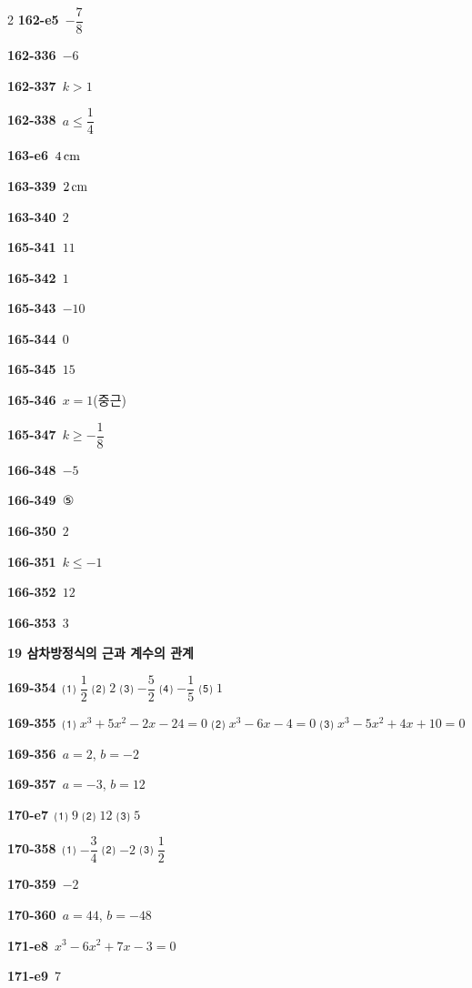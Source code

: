 \documentclass[10pt,a4paper]{article}
\begin{document}
\begin{multicols}{2}
\noindent\textbf{162-e5}\ $-\dfrac{7}{8}$\par
\noindent\textbf{162-336}\ $-6$\par
\noindent\textbf{162-337}\ $k>1$\par
\noindent\textbf{162-338}\ $a\le\dfrac{1}{4}$\par
\noindent\textbf{163-e6}\ $4\mkern3mu \mathrm{cm}$\par
\noindent\textbf{163-339}\ $2\mkern3mu \mathrm{cm}$\par
\noindent\textbf{163-340}\ $2$\par
\noindent\textbf{165-341}\ $11$\par
\noindent\textbf{165-342}\ $1$\par
\noindent\textbf{165-343}\ $-10$\par
\noindent\textbf{165-344}\ $0$\par
\noindent\textbf{165-345}\ $15$\par
\noindent\textbf{165-346}\ $x=1$(중근)\par
\noindent\textbf{165-347}\ $k\ge-\dfrac{1}{8}$\par
\noindent\textbf{166-348}\ $-5$\par
\noindent\textbf{166-349}\ ⑤\par
\noindent\textbf{166-350}\ $2$\par
\noindent\textbf{166-351}\ $k\le -1$\par
\noindent\textbf{166-352}\ $12$\par
\noindent\textbf{166-353}\ $3$\par
\noindent\textbf{19 삼차방정식의 근과 계수의 관계}\par\smallskip
\noindent\textbf{169-354}\ ⑴ $\dfrac{1}{2}$ ⑵ $2$ ⑶ $-\dfrac{5}{2}$ ⑷ $-\dfrac{1}{5}$ ⑸ $1$\par
\noindent\textbf{169-355}\ ⑴ $x^3+5x^2-2x-24=0$ ⑵ $x^3-6x-4=0$ ⑶ $x^3-5x^2+4x+10=0$\par
\noindent\textbf{169-356}\ $a=2$, $b=-2$\par
\noindent\textbf{169-357}\ $a=-3$, $b=12$\par
\noindent\textbf{170-e7}\ ⑴ $9$ ⑵ $12$ ⑶ $5$\par
\noindent\textbf{170-358}\ ⑴ $-\dfrac{3}{4}$ ⑵ $-2$ ⑶ $\dfrac{1}{2}$\par
\noindent\textbf{170-359}\ $-2$\par
\noindent\textbf{170-360}\ $a=44$, $b=-48$\par
\noindent\textbf{171-e8}\ $x^3-6x^2+7x-3=0$\par
\noindent\textbf{171-e9}\ $7$\par

\end{multicols}
\end{document}
